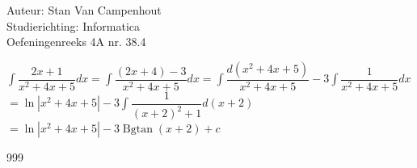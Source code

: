 \documentclass[a4paper]{article}
\begin{document}
  
\noindent \large Auteur: Stan Van Campenhout \\
\noindent \large Studierichting:  Informatica\\
\noindent \large Oefeningenreeks 4A nr. 38.4\\

\medskip

\normalsize

$ \displaystyle\int\dfrac{2x+1}{x^2+4x+5}dx = \displaystyle\int\dfrac{\left(2x+4\right)-3}{x^2+4x+5}dx 
= \displaystyle\int\dfrac{d\left(x^2+4x+5\right)}{x^2+4x+5} -3\displaystyle\int\dfrac{1}{x^2+4x+5}dx $\\

$ = \ln|x^2+4x+5| -3\displaystyle\int\dfrac{1}{\left(x+2\right)^2+1}d\left(x+2\right) $\\


$ = \ln|x^2+4x+5| -3\operatorname{Bgtan}\left(x+2\right) + c $\\

\begin{thebibliography}{999}
\end{thebibliography}
\end{document}
